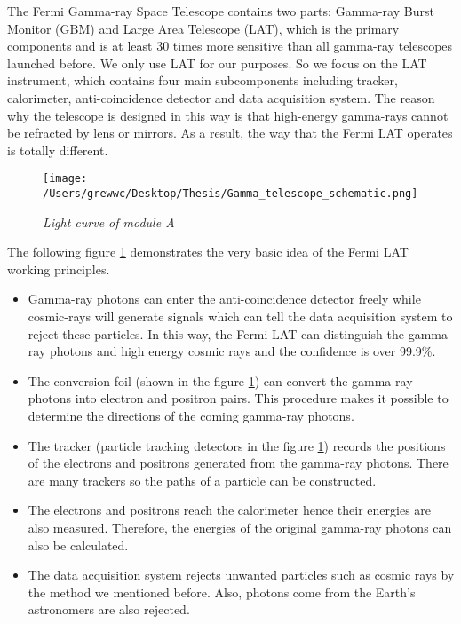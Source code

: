 \documentclass[12pt]{report}
\newcommand{\mycaption}[1]{\caption{\textit{\footnotesize #1}}}
\begin{document}
        The Fermi Gamma-ray Space Telescope contains two parts: Gamma-ray Burst Monitor (GBM) and Large 
        Area Telescope (LAT), which is the primary components and is at least 30 times more sensitive than 
        all gamma-ray telescopes launched before. We only use LAT for our purposes. So we 
        focus on the LAT instrument, which contains four main subcomponents including tracker, calorimeter,
        anti-coincidence detector and data acquisition system. The reason why the telescope is designed in 
        this way is that high-energy gamma-rays cannot be refracted by lens or mirrors. As a result, the way
        that the Fermi LAT operates is totally different. 

        \begin{figure}[!ht]  
          \begin{minipage}{1\textwidth}
            \begin{center} 
                \texttt{[image: /Users/grewwc/Desktop/Thesis/Gamma\_telescope\_schematic.png]}
                \mycaption{Light curve of module A}
                \label{fig:fermi schematic}
            \end{center}
          \end{minipage}
        \end{figure}
        The following figure \ref{fig:fermi schematic} demonstrates the very basic idea of the Fermi LAT working
        principles. \\

        \begin{itemize}
          \item Gamma-ray photons can enter the anti-coincidence detector freely while cosmic-rays will generate
            signals which can tell the data acquisition system to reject these particles. In this way, the 
            Fermi LAT can distinguish the gamma-ray photons and high energy cosmic rays and the confidence is 
            over 99.9\%. 
          \item The conversion foil (shown in the figure \ref{fig:fermi schematic}) can convert the 
            gamma-ray photons into electron and positron pairs. This procedure makes it possible to determine 
            the directions of the coming gamma-ray photons. 
          \item The tracker (particle tracking detectors in the figure \ref{fig:fermi schematic}) records the 
            positions of the electrons and positrons generated from the gamma-ray photons. There are many 
            trackers so the paths of a particle can be constructed.
          \item The electrons and positrons reach the calorimeter hence their energies are also measured.
            Therefore, the energies of the original gamma-ray photons can also be calculated. 
          \item The data acquisition system rejects unwanted particles such as cosmic rays by the method we mentioned 
            before. Also, photons come from the Earth's astronomers are also rejected. 
        \end{itemize}
\end{document}
